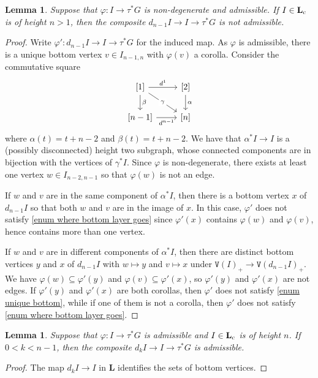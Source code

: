 \documentclass{amsart}
\numberwithin{theorem}{subsection}
\newtheorem{lemma}[theorem]{Lemma}
\theoremstyle{definition}
\newcommand{\name}[1]{\ensuremath{\text{\textup{#1}}}}
\newcommand{\levelg}{\mathbf{L}}
\newcommand{\levelgconn}{\levelg_{\name{c}}}
\newcommand{\vertex}{\mathtt{V}}
\begin{document}
\begin{lemma}\label{lemma one lower nonadmissible}
Suppose that $\varphi \colon I \to \tau^* G$ is non-degenerate and admissible.
If $I \in \levelgconn$ is of height $n > 1$, then the composite $d_{n-1} I \to I \to \tau^* G$ is not admissible.
\end{lemma}
\begin{proof}
Write $\varphi' \colon d_{n-1}I \to I \to \tau^*G$ for the induced map.
As $\varphi$ is admissible, there is a unique bottom vertex $v\in I_{n-1,n}$ with $\varphi(v)$ a corolla.
Consider the commutative square
\[ \begin{tikzcd}
{[1]} \rar{d^1} \dar{\beta} \arrow[dr,"\gamma" description] & {[2]} \dar{\alpha} \\
{[n-1]} \rar[swap]{d^{n-1}} & {[n]}
\end{tikzcd} \]
where $\alpha(t) = t + n - 2$ and $\beta(t) = t + n - 2$.
We have that $\alpha^* I \to I$ is a (possibly disconnected) height two subgraph, whose connected components are in bijection with the vertices of $\gamma^*I$.
Since $\varphi$ is non-degenerate, there exists at least one vertex $w \in I_{n-2,n-1}$ so that $\varphi(w)$ is not an edge.

If $w$ and $v$ are in the same component of $\alpha^*I$, then there is a bottom vertex $x$ of $d_{n-1}I$ so that both $w$ and $v$ are in the image of $x$. 
In this case, $\varphi'$ does not satisfy \eqref{enum where bottom layer goes} since $\varphi'(x)$ contains $\varphi(w)$ and $\varphi(v)$, hence contains more than one vertex.

If $w$ and $v$ are in different components of $\alpha^*I$, then there are distinct bottom vertices $y$ and $x$ of $d_{n-1}I$ with $w\mapsto y$ and $v \mapsto x$ under $\vertex(I)_+ \rightarrow \vertex(d_{n-1}I)_+$.
We have $\varphi(w) \subseteq \varphi'(y)$ and $\varphi(v) \subseteq \varphi'(x)$, so $\varphi'(y)$ and $\varphi'(x)$ are not edges.
If $\varphi'(y)$ and $\varphi'(x)$ are both corollas, then $\varphi'$ does not satisfy \eqref{enum unique bottom}, while if one of them is not a corolla, then $\varphi'$ does not satisfy \eqref{enum where bottom layer goes}.
\end{proof}

\begin{lemma}\label{lemma preservation of admissibility}
Suppose that $\varphi \colon I \to \tau^* G$ is admissible and $I \in \levelgconn$ is of height $n$.
If $0< k < n-1$, then the composite $d_k I \to I \to \tau^* G$ is admissible.
\end{lemma}
\begin{proof}
The map $d_k I \to I$ in $\levelg$ identifies the sets of bottom vertices.
\end{proof}
\end{document}
